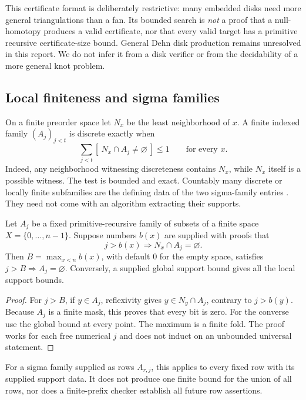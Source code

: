 This certificate format is deliberately restrictive: many embedded disks need more general triangulations than a fan. Its bounded search is \emph{not} a proof that a null-homotopy produces a valid certificate, nor that every valid target has a primitive recursive certificate-size bound. General Dehn disk production remains unresolved in this report. We do not infer it from a disk verifier or from the decidability of a more general knot problem.

\subsection{Local finiteness and sigma families}

On a finite preorder space let $N_x$ be the least neighborhood of $x$. A finite indexed family $(A_j)_{j<t}$ is discrete exactly when
\[
 \sum_{j<t}[\ N_x\cap A_j\ne\varnothing\ ]\leq1
 \qquad\text{for every }x.
\]
Indeed, any neighborhood witnessing discreteness contains $N_x$, while $N_x$ itself is a possible witness. The test is bounded and exact. Countably many discrete or locally finite subfamilies are the defining data of the two sigma-family entries \cite{MWSigmaDiscrete,MWSigmaLocal}. They need not come with an algorithm extracting their supports.

\begin{proposition}
Let $A_j$ be a fixed primitive-recursive family of subsets of a finite space $X=\{0,\ldots,n-1\}$. Suppose numbers $b(x)$ are supplied with proofs that
\[
 j>b(x)\Longrightarrow N_x\cap A_j=\varnothing .
\]
Then $B=\max_{x<n}b(x)$, with default $0$ for the empty space, satisfies
$j>B\Longrightarrow A_j=\varnothing$. Conversely, a supplied global support bound gives all the local support bounds.
\end{proposition}
\begin{proof}
For $j>B$, if $y\in A_j$, reflexivity gives $y\in N_y\cap A_j$, contrary to $j>b(y)$. Because $A_j$ is a finite mask, this proves that every bit is zero. For the converse use the global bound at every point. The maximum is a finite fold. The proof works for each free numerical $j$ and does not induct on an unbounded universal statement.
\end{proof}

For a sigma family supplied as rows $A_{r,j}$, this applies to every fixed row with its supplied support data. It does not produce one finite bound for the union of all rows, nor does a finite-prefix checker establish all future row assertions.

